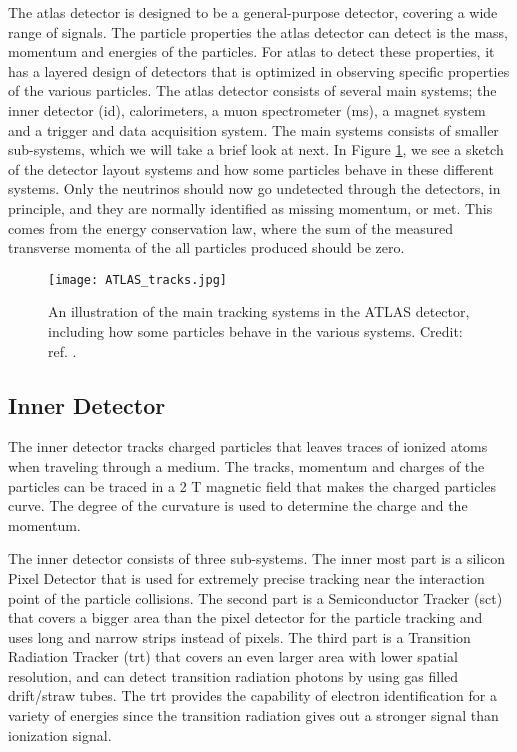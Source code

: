 \documentclass[a4paper, american, 12pt]{report}
\begin{document}
	The \acrshort{atlas} detector is designed to be a general-purpose detector, covering a wide range of signals. The particle properties the \acrshort{atlas} detector can detect is the mass, momentum and energies of the particles. For \acrshort{atlas} to detect these properties, it has a layered design of detectors that is optimized in observing specific properties of the various particles. The \acrshort{atlas} detector consists of several main systems; the inner detector (\acrshort{id}), calorimeters, a muon spectrometer (\acrshort{ms}), a magnet system and a trigger and data acquisition system. The main systems consists of smaller sub-systems, which we will take a brief look at next. In Figure \ref{fig:ATLAStracking}, we see a sketch of the detector layout systems and how some particles behave in these different systems. Only the neutrinos should now go undetected through the detectors, in principle, and they are normally identified as missing momentum, or \acrshort{met}. This comes from the energy conservation law, where the sum of the measured transverse momenta of the all particles produced should be zero. 
	\begin{figure}[htbp!]
		\centering\texttt{[image: ATLAS\_tracks.jpg]}
		\caption[The ATLAS detector tracking system.]{An illustration of the main tracking systems in the ATLAS detector, including how some particles behave in the various systems. Credit: ref. \cite{ATLAStracking}.\label{fig:ATLAStracking}}
	\end{figure} 
	
	
	\subsection{Inner Detector}
	\label{subsect:Theory-InnerDetector}
	The inner detector tracks charged particles that leaves traces of ionized atoms when traveling through a medium. The tracks, momentum and charges of the particles can be traced in a 2 T magnetic field that makes the charged particles curve. The degree of the curvature is used to determine the charge and the momentum. 
	
	The inner detector consists of three sub-systems. The inner most part is a silicon Pixel Detector that is used for extremely precise tracking near the interaction point of the particle collisions. The second part is a Semiconductor Tracker (\acrshort{sct}) that covers a bigger area than the pixel detector for the particle tracking and uses long and narrow strips instead of pixels. The third part is a Transition Radiation Tracker (\acrshort{trt}) that covers an even larger area with lower spatial resolution, and can detect transition radiation photons by using gas filled drift/straw tubes. The \acrshort{trt} provides the capability of electron identification for a variety of energies since the transition radiation gives out a stronger signal than ionization signal.
	
\end{document}
